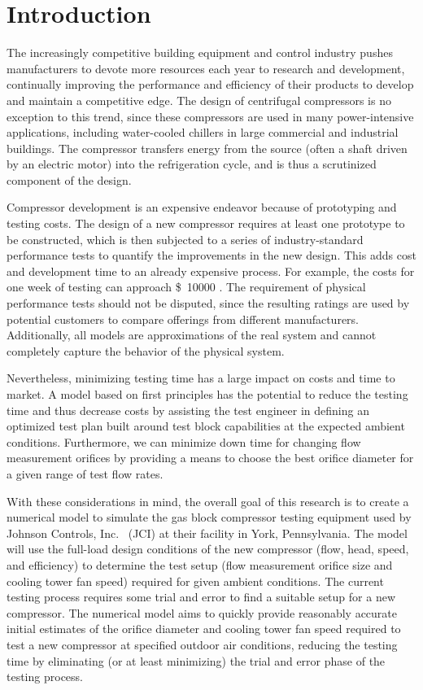 \chapter{Introduction} \label{cha:intro}
The increasingly competitive building equipment and control industry 
pushes manufacturers to devote more resources each year to research and 
development, continually improving the performance and efficiency 
of their products to develop and maintain a competitive edge. 
The design of centrifugal compressors is no exception to this trend, 
since these compressors are used in many power-intensive applications,
including water-cooled chillers in large commercial and industrial buildings. 
The compressor transfers energy from the source (often a shaft driven by an 
electric motor) into the refrigeration cycle, and is thus 
a scrutinized component of the design.

Compressor development is an expensive endeavor 
because of prototyping and testing costs. 
The design of a new compressor requires at least one 
prototype to be constructed, which is then subjected to 
a series of industry-standard performance tests 
to quantify the improvements in the new design.
This adds cost and development time to an already expensive process. 
For example, the costs for one week of testing can approach 
\SI{10000}[\$]{} \citep{sommer2013}.
The requirement of physical performance tests should not be disputed, 
since the resulting ratings are used by potential customers 
to compare offerings from different manufacturers. 
Additionally, all models are approximations of the real system and 
cannot completely capture the behavior of the physical system.

Nevertheless, minimizing testing time has a 
large impact on costs and time to market. 
A model based on first principles has the potential to 
reduce the testing time and thus decrease costs by 
assisting the test engineer in defining an optimized test plan 
built around test block capabilities at the expected ambient conditions.
Furthermore, we can minimize down time for changing 
flow measurement orifices by providing a means 
to choose the best orifice diameter for a given range of test flow rates.

With these considerations in mind, the overall goal of this research is to 
create a numerical model to simulate the  gas block 
compressor testing equipment used by Johnson Controls, Inc.~%
(JCI) 
at their facility in York, Pennsylvania. 
The model will use the full-load design conditions of the new compressor 
(flow, head, speed, and efficiency) 
to determine the test setup 
(flow measurement orifice size and cooling tower fan speed) 
required for given ambient conditions. 
The current testing process requires some trial and error 
to find a suitable setup for a new compressor. 
The numerical model aims to quickly provide reasonably accurate 
initial estimates of the orifice diameter and cooling tower fan speed 
required to test a new compressor at specified outdoor air conditions, 
reducing the testing time by eliminating (or at least minimizing) 
the trial and error phase of the testing process.

